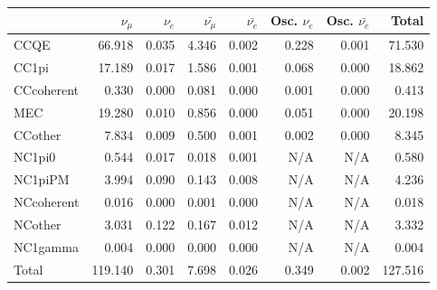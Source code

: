 
\begin{table}
\center
\begin{tabular} { | l ||r | r | r | r | r | r | | r | }
\hline

              & $\nu_\mu$            & $\nu_e$              & $\bar{\nu_\mu}$      & $\bar{\nu_e}$        & Osc. $\nu_e$         & Osc. $\bar{\nu_e}$   & Total                \\ \hline\hline
 CCQE         & 66.918               & 0.035                & 4.346                & 0.002                & 0.228                & 0.001                & 71.530               \\ \hline
 CC1pi        & 17.189               & 0.017                & 1.586                & 0.001                & 0.068                & 0.000                & 18.862               \\ \hline
 CCcoherent   & 0.330                & 0.000                & 0.081                & 0.000                & 0.001                & 0.000                & 0.413                \\ \hline
 MEC          & 19.280               & 0.010                & 0.856                & 0.000                & 0.051                & 0.000                & 20.198               \\ \hline
 CCother      & 7.834                & 0.009                & 0.500                & 0.001                & 0.002                & 0.000                & 8.345                \\ \hline
 NC1pi0       & 0.544                & 0.017                & 0.018                & 0.001                & N/A                  & N/A                  & 0.580                \\ \hline
 NC1piPM      & 3.994                & 0.090                & 0.143                & 0.008                & N/A                  & N/A                  & 4.236                \\ \hline
 NCcoherent   & 0.016                & 0.000                & 0.001                & 0.000                & N/A                  & N/A                  & 0.018                \\ \hline
 NCother      & 3.031                & 0.122                & 0.167                & 0.012                & N/A                  & N/A                  & 3.332                \\ \hline
 NC1gamma     & 0.004                & 0.000                & 0.000                & 0.000                & N/A                  & N/A                  & 0.004                \\ \hline
\hline
 Total        & 119.140              & 0.301                & 7.698                & 0.026                & 0.349                & 0.002                & 127.516              \\ \hline


\end{tabular}
\end{table}
